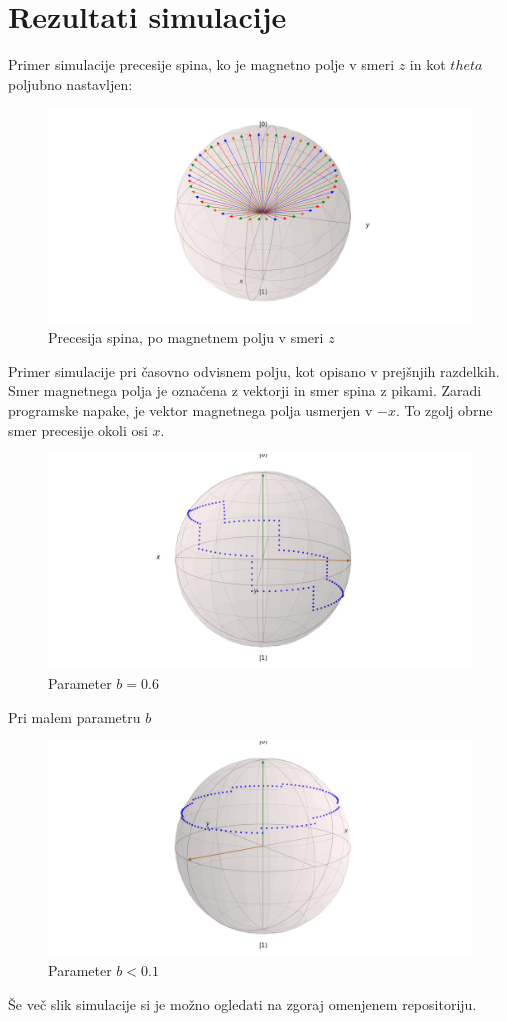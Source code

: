 \documentclass[12pt, a4paper]{article}
\begin{document}
\section{Rezultati simulacije}
Primer simulacije precesije spina, ko je magnetno polje v smeri $z$ in kot $theta$ poljubno nastavljen:
\begin{figure}[H]
  \includegraphics[width=400pt]{slike/precesija_po_osi_z.png}
  \caption{Precesija spina, po magnetnem polju v smeri $z$}
  \label{fig:boat1}
\end{figure}
Primer simulacije pri časovno odvisnem polju, kot opisano v prejšnjih razdelkih. Smer magnetnega polja je označena z vektorji in smer spina z pikami. Zaradi programske napake, je vektor magnetnega polja usmerjen v $-x$. To zgolj obrne smer precesije okoli osi $x$.
\begin{figure}[H]
	\includegraphics[width=400pt]{slike/b=06.png}
	\caption{Parameter $b = 0.6$ }
	\label{fig:boat1}
\end{figure}
Pri malem parametru $b$
\begin{figure}[H]
	\includegraphics[width=400pt]{slike/precesija_v_cas}
	\caption{Parameter $b < 0.1$ }
	\label{fig:boat1}
  \end{figure}
Še več slik simulacije si je možno ogledati na zgoraj omenjenem repositoriju.
\end{document}
